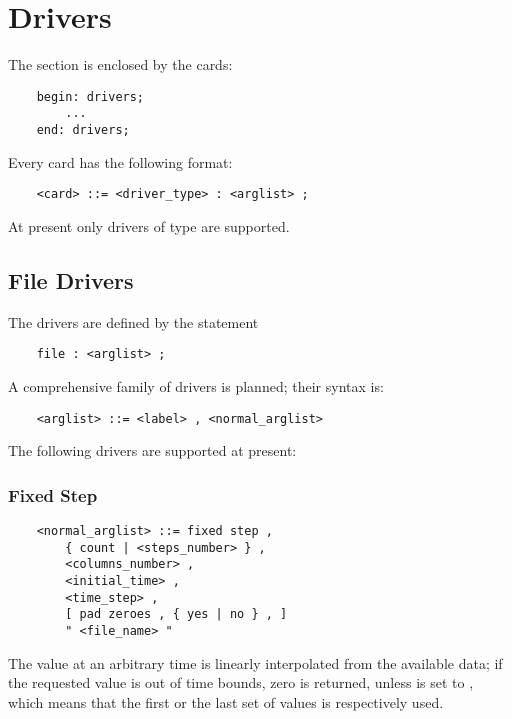 %
%
%
%
%
% 
%
%

\chapter{Drivers}\label{sec:DRIVERS}
The  section is enclosed by the cards:
\begin{verbatim}
    begin: drivers;
        ...
    end: drivers;
\end{verbatim}
Every  card has the following format:
\begin{verbatim}
    <card> ::= <driver_type> : <arglist> ;
\end{verbatim}
At present only  drivers of type  are supported.

\section{File Drivers}
The  drivers are defined by the statement
\begin{verbatim}
    file : <arglist> ;
\end{verbatim}
A comprehensive family of  drivers is planned;
their syntax is:
\begin{verbatim}
    <arglist> ::= <label> , <normal_arglist>
\end{verbatim}
The following  drivers are supported at present:



\subsection{Fixed Step}
\begin{verbatim}
    <normal_arglist> ::= fixed step , 
        { count | <steps_number> } ,
        <columns_number> ,
        <initial_time> ,
        <time_step> ,
        [ pad zeroes , { yes | no } , ]
        " <file_name> "
\end{verbatim}
The value at an arbitrary time is linearly interpolated from the available
data; if the requested value is out of time bounds, zero is returned,
unless  is set to , which means that the first
or the last set of values is respectively used.



